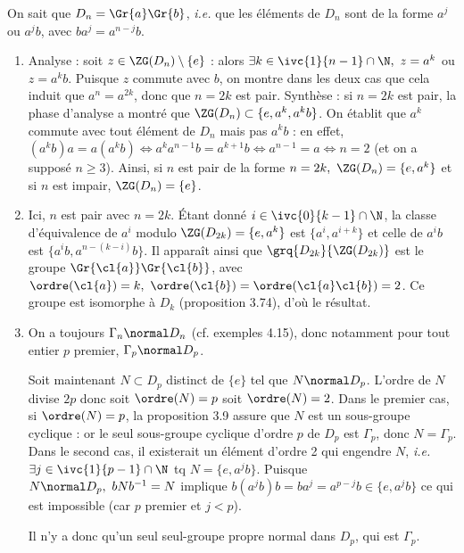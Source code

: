 On sait que $D_n = \Gr{a}\Gr{b}$, \emph{i.e.} que les éléments de $D_n$ sont de la forme $a^j$ ou $a^jb$, avec $ba^j = a^{n-j}b$.


\begin{enumerate}
    \item Analyse : soit $z\in \ZG(D_n) \setminus \{e\}$ : alors $\exists k\in \ivc{1}{n-1}\cap \N,~ z = a^k$ ou $z=a^kb$. Puisque $z$ commute avec $b$, on
     montre dans les deux cas que cela induit que $a^n = a^{2k}$, donc que $n=2k$ est pair. Synthèse : si $n=2k$ est pair, la phase d'analyse a montré que $\ZG(D_n) \subset \{e, a^k, a^kb\}$. On établit que $a^k$ commute avec
     tout élément de $D_n$ mais pas $a^kb$ : en effet, $(a^kb)a = a(a^kb) \iff a^k a^{n-1}b = a^{k+1}b \iff a^{n-1} = a \iff n = 2$ (et on a supposé $n\geq 3$). Ainsi, si $n$ est pair de la forme $n=2k,~ \ZG(D_n) = \{e, a^k\}$ et si $n$ est impair, $\ZG(D_n) = \{e\}$.
     \item Ici, $n$ est pair avec $n= 2k$. Étant donné $i \in \ivc{0}{k-1}\cap \N$, la classe d'équivalence de $a^i$ modulo $\ZG(D_{2k})=\{e, a^k\}$ 
     est $\{a^i, a^{i+k}\}$ et celle de $a^ib$ est $\{a^ib, a^{n-(k-i)}b\}$. Il apparaît ainsi que $\grq{D_{2k}}{\ZG(D_{2k})}$ est le groupe 
     $\Gr{\cl{a}}\Gr{\cl{b}}$, avec $\ordre(\cl{a}) = k,~ \ordre(\cl{b})=\ordre(\cl{a}\cl{b}) =2$. Ce groupe est isomorphe à $D_k$ (proposition 3.74), d'où le résultat.
     \item On a toujours $\Gamma_n \normal D_n$ (cf. exemples 4.15), donc notamment pour tout entier $p$ premier, $\Gamma_p \normal D_p$.
     
     Soit maintenant $N\subset D_p$ distinct de $\{e\}$ tel que $N\normal D_p$. L'ordre de $N$ divise $2p$ donc soit $\ordre(N)=p$ soit $\ordre(N)=2$. 
     Dans le premier cas, si $\ordre(N)=p$, la proposition 3.9 assure que $N$ est un sous-groupe cyclique : or le seul sous-groupe cyclique d'ordre $p$ de $D_p$ est $\Gamma_p$, donc 
     $N=\Gamma_p$. Dans le second cas, il existerait un élément d'ordre 2 qui engendre $N$, \emph{i.e.} $\exists j\in \ivc{1}{p-1}\cap \N$ tq $N=\{e, a^jb\}$. Puisque $N\normal D_p,~ bNb^{-1} = N$ implique
     $b(a^jb)b = ba^j = a^{p-j}b \in \{e, a^jb\}$ ce qui est impossible (car $p$ premier et $j<p$). 

     Il n'y a donc qu'un seul seul-groupe propre normal dans $D_p$, qui est $\Gamma_p$.
    \end{enumerate}
